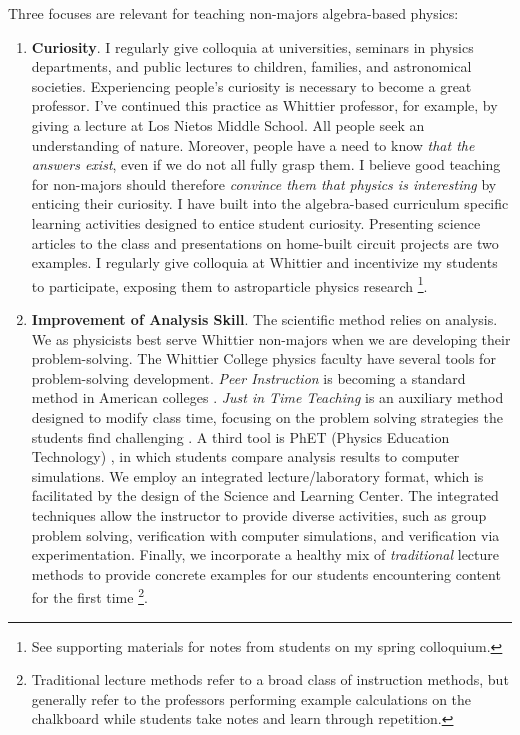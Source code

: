 \documentclass[../../main.tex]{subfiles}
\begin{document}
Three focuses are relevant for teaching non-majors algebra-based physics:
\begin{enumerate}
\item \textbf{Curiosity}.  I regularly give colloquia at universities, seminars in physics departments, and public lectures to children, families, and astronomical societies.  Experiencing people's curiosity is necessary to become a great professor.  I've continued this practice as Whittier professor, for example, by giving a lecture at Los Nietos Middle School.  All people seek an understanding of nature.  Moreover, people have a need to know \textit{that the answers exist}, even if we do not all fully grasp them.  I believe good teaching for non-majors should therefore \textit{convince them that physics is interesting} by enticing their curiosity.  I have built into the algebra-based curriculum specific learning activities designed to entice student curiosity.  Presenting science articles to the class and presentations on home-built circuit projects are two examples.  I regularly give colloquia at Whittier and incentivize my students to participate, exposing them to astroparticle physics research \footnote{See supporting materials for notes from students on my spring colloquium.}.

\item \textbf{Improvement of Analysis Skill}.  The scientific method relies on analysis.  We as physicists best serve Whittier non-majors when we are developing their problem-solving.  The Whittier College physics faculty have several tools for problem-solving development.  \textit{Peer Instruction} is becoming a standard method in American colleges \cite{mazur}.  \textit{Just in Time Teaching} is an auxiliary method designed to modify class time, focusing on the problem solving strategies the students find challenging \cite{howpeoplelearn}.  A third tool is PhET (Physics Education Technology) \cite{phet}, in which students compare analysis results to computer simulations.  We employ an integrated lecture/laboratory format, which is facilitated by the design of the Science and Learning Center.  The integrated techniques allow the instructor to provide diverse activities, such as group problem solving, verification with computer simulations, and verification via experimentation.  Finally, we incorporate a healthy mix of \textit{traditional} lecture methods to provide concrete examples for our students encountering content for the first time \footnote{Traditional lecture methods refer to a broad class of instruction methods, but generally refer to the professors performing example calculations on the chalkboard while students take notes and learn through repetition.}.


\end{enumerate}
\end{document}
